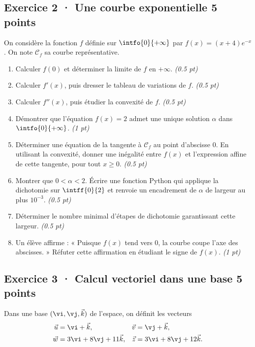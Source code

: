 \subsection*{Exercice 2 · Une courbe exponentielle \hfill 5 points}On considère la fonction $f$ définie sur $\intfo{0}{+\infty}$ par $f(x)=(x+4)e^{-x}$. On note $\mathcal C_f$ sa courbe représentative.

\begin{enumerate}

\item Calculer $f(0)$ et déterminer la limite de $f$ en $+\infty$. \hfill\textit{(\num{0,5} pt)}

\item Calculer $f' (x)$, puis dresser le tableau de variations de $f$. \hfill\textit{(\num{0,5} pt)}

\item Calculer $f'' (x)$, puis étudier la convexité de $f$. \hfill\textit{(\num{0,5} pt)}

\item Démontrer que l'équation $f(x)=2$ admet une unique solution $\alpha$ dans $\intfo{0}{+\infty}$. \hfill\textit{(1 pt)}

\item Déterminer une équation de la tangente à $\mathcal C_f$ au point d'abscisse $0$. En utilisant la convexité, donner une inégalité entre $f(x)$ et l'expression affine de cette tangente, pour tout $x\ge0$. \hfill\textit{(\num{0,5} pt)}

\item Montrer que $0<\alpha<2$. Écrire une fonction Python qui applique la dichotomie sur $\intff{0}{2}$ et renvoie un encadrement de $\alpha$ de largeur au plus $10^{-3}$. \hfill\textit{(\num{0,5} pt)}

\item Déterminer le nombre minimal d'étapes de dichotomie garantissant cette largeur. \hfill\textit{(\num{0,5} pt)}

\item Un élève affirme : « Puisque $f(x)$ tend vers $0$, la courbe coupe l'axe des abscisses. » Réfuter cette affirmation en étudiant le signe de $f(x)$. \hfill\textit{(1 pt)}

\end{enumerate}

\mxnewpage{}

\subsection*{Exercice 3 · Calcul vectoriel dans une base \hfill 5 points}Dans une base $(\vi,\vj,\vec k)$ de l'espace, on définit les vecteurs
\[\begin{aligned}\vec u&=\vi+\vec k,&\vec v&=\vj+\vec k,\\
\vec w&=3\vi+8\vj+11\vec k,&\vec z&=3\vi+8\vj+12\vec k.\end{aligned}\]

